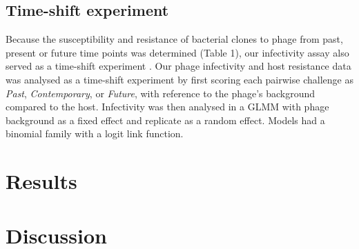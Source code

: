 \documentclass [12pt, a4paper, twoside]  {article}
\begin{document}
\subsection*{Time-shift experiment}
Because the susceptibility and resistance of bacterial clones to phage from past, present or future time points was determined (Table 1), our infectivity assay also served as a time-shift experiment \citep{gaba2009TimeShiftReview}. Our phage infectivity and host resistance data was analysed as a time-shift experiment by first scoring each pairwise challenge as \textit{Past}, \textit{Contemporary}, or \textit{Future}, with reference to the phage’s background compared to the host. Infectivity was then analysed in a GLMM with phage background as a fixed effect and replicate as a random effect. Models had a binomial family with a logit link function.

\section*{Results}

\section*{Discussion}


\clearpage
\end{document}
